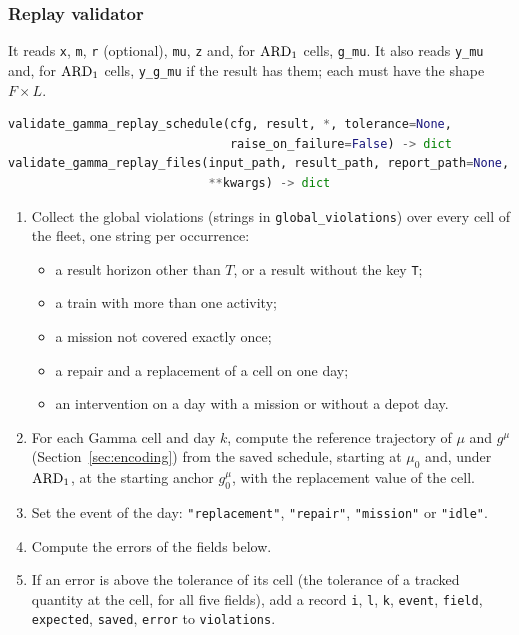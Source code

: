 \subsubsection{Replay validator}

It reads \texttt{x}, \texttt{m}, \texttt{r} (optional), \texttt{mu}, \texttt{z} and, for $\mathrm{ARD}_{1}$ cells, \texttt{g\_mu}. It also reads \texttt{y\_mu} and, for $\mathrm{ARD}_{1}$ cells, \texttt{y\_g\_mu} if the result has them; each must have the shape $F \times L$.

\begin{lstlisting}[language=Python]
validate_gamma_replay_schedule(cfg, result, *, tolerance=None,
                               raise_on_failure=False) -> dict
validate_gamma_replay_files(input_path, result_path, report_path=None,
                            **kwargs) -> dict
\end{lstlisting}

\begin{enumerate}[nosep,label=\arabic*.]
  \item Collect the global violations (strings in \texttt{global\_violations}) over every cell of the fleet, one string per occurrence:
  \begin{itemize}[nosep]
    \item a result horizon other than $T$, or a result without the key \texttt{T};
    \item a train with more than one activity;
    \item a mission not covered exactly once;
    \item a repair and a replacement of a cell on one day;
    \item an intervention on a day with a mission or without a depot day.
  \end{itemize}
  \item For each Gamma cell and day $k$, compute the reference trajectory of $\mu$ and $g^{\mu}$ (Section~\ref{sec:encoding}) from the saved schedule, starting at $\mu_0$ and, under $\mathrm{ARD}_{1}$, at the starting anchor $g^{\mu}_0$, with the replacement value of the cell.
  \item Set the event of the day: \texttt{"replacement"}, \texttt{"repair"}, \texttt{"mission"} or \texttt{"idle"}.
  \item Compute the errors of the fields below.
  \item If an error is above the tolerance of its cell (the tolerance of a tracked quantity at the cell, for all five fields), add a record \texttt{i}, \texttt{l}, \texttt{k}, \texttt{event}, \texttt{field}, \texttt{expected}, \texttt{saved}, \texttt{error} to \texttt{violations}.
\end{enumerate}

